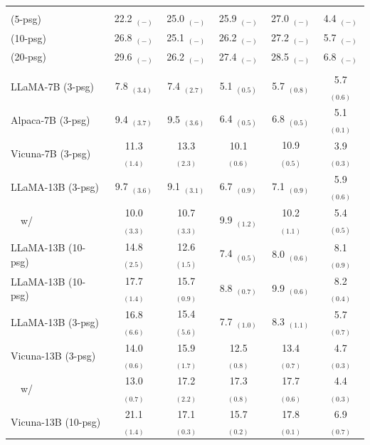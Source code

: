 \documentclass[11pt]{article}
\newcommand{\vani}{{\sc{Vanilla}}}
\newcommand{\summ}{{\sc{Summ}}}
\newcommand{\snippet}{{\sc{Snippet}}}
\newcommand{\rerank}{{\sc{Rerank}}}
\newcommand{\oracle}{{\sc{Oracle}}}
\newcommand{\tableskip}{\noalign{\vskip 2pt}}
\newcommand{\headercolorlong}{\rowcolor{gray!17}}
\begin{document}
\begin{table}[ht]
\begin{tabular}{lccccc}
            \headercolorlong
            \tableskip
            \multicolumn{6}{c}{\textbf{GPT-4}} \\
            \tableskip

            \vani{} (5-psg)  & 22.2 $_{(-)}$&25.0 $_{(-)}$&25.9 $_{(-)}$&27.0 $_{(-)}$&4.4 $_{(-)}$\\
            \vani{} (10-psg) & 26.8 $_{(-)}$&25.1 $_{(-)}$&26.2 $_{(-)}$&27.2 $_{(-)}$&5.7 $_{(-)}$\\
            \vani{} (20-psg) & 29.6 $_{(-)}$&26.2 $_{(-)}$&27.4 $_{(-)}$&28.5 $_{(-)}$&6.8 $_{(-)}$\\


            \rowcolor{gray!16}
            \multicolumn{6}{c}{\textbf{Open-source}} \\
            LLaMA-7B \vani{} (3-psg) & 7.8 $_{(3.4)}$ & 7.4 $_{(2.7)}$ & 5.1 $_{(0.5)}$ & 5.7 $_{(0.8)}$ & 5.7 $_{(0.6)}$ \\
            Alpaca-7B \vani{} (3-psg) & 9.4 $_{(3.7)}$ & 9.5 $_{(3.6)}$ & 6.4 $_{(0.5)}$ & 6.8 $_{(0.5)}$ & 5.1 $_{(0.1)}$ \\
            Vicuna-7B \vani{} (3-psg) & 11.3 $_{(1.4)}$ & 13.3 $_{(2.3)}$ & 10.1 $_{(0.6)}$ & 10.9 $_{(0.5)}$ & 3.9 $_{(0.3)}$ \\ \midrule
            LLaMA-13B \vani{} (3-psg) & 9.7 $_{(3.6)}$ & 9.1 $_{(3.1)}$ & 6.7 $_{(0.9)}$ & 7.1 $_{(0.9)}$ & 5.9 $_{(0.6)}$ \\
            ~~w/ \rerank & 10.0 $_{(3.3)}$ & 10.7 $_{(3.3)}$ & 9.9 $_{(1.2)}$ & 10.2 $_{(1.1)}$ & 5.4 $_{(0.5)}$ \\
            LLaMA-13B \summ{} (10-psg) & 14.8 $_{(2.5)}$ & 12.6 $_{(1.5)}$ & 7.4 $_{(0.5)}$ & 8.0 $_{(0.6)}$ & 8.1 $_{(0.9)}$ \\
            LLaMA-13B \snippet{} (10-psg) & 17.7 $_{(1.4)}$ & 15.7 $_{(0.9)}$ & 8.8 $_{(0.7)}$ & 9.9 $_{(0.6)}$ & 8.2 $_{(0.4)}$ \\
            LLaMA-13B \oracle{} (3-psg) & 16.8 $_{(6.6)}$ & 15.4 $_{(5.6)}$ & 7.7 $_{(1.0)}$ & 8.3 $_{(1.1)}$ & 5.7 $_{(0.7)}$ \\ \midrule
            Vicuna-13B \vani{} (3-psg) & 14.0 $_{(0.6)}$ & 15.9 $_{(1.7)}$ & 12.5 $_{(0.8)}$ & 13.4 $_{(0.7)}$ & 4.7 $_{(0.3)}$ \\
            ~~w/ \rerank & 13.0 $_{(0.7)}$ & 17.2 $_{(2.2)}$ & 17.3 $_{(0.8)}$ & 17.7 $_{(0.6)}$ & 4.4 $_{(0.3)}$ \\
            Vicuna-13B \summ{} (10-psg) & 21.1 $_{(1.4)}$ & 17.1 $_{(0.3)}$ & 15.7 $_{(0.2)}$ & 17.8 $_{(0.1)}$ & 6.9 $_{(0.7)}$ \\

\end{tabular}
\end{table}
\end{document}
